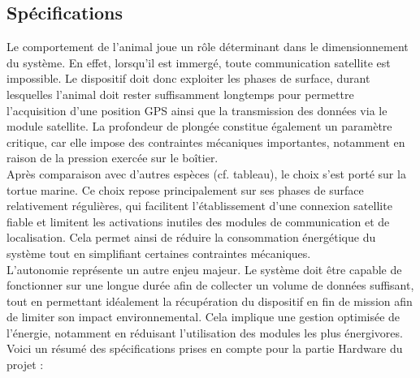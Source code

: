 \documentclass[12pt]{article}
\begin{document}
\subsection{Spécifications}

Le comportement de l’animal joue un rôle déterminant dans le dimensionnement du système. En effet, lorsqu’il est immergé, toute communication satellite est impossible. Le dispositif doit donc exploiter les phases de surface, durant lesquelles l’animal doit rester suffisamment longtemps pour permettre l’acquisition d’une position GPS ainsi que la transmission des données via le module satellite. La profondeur de plongée constitue également un paramètre critique, car elle impose des contraintes mécaniques importantes, notamment en raison de la pression exercée sur le boîtier. \\
Après comparaison avec d’autres espèces (cf. tableau), le choix s’est porté sur la tortue marine. Ce choix repose principalement sur ses phases de surface relativement régulières, qui facilitent l’établissement d’une connexion satellite fiable et limitent les activations inutiles des modules de communication et de localisation. Cela permet ainsi de réduire la consommation énergétique du système tout en simplifiant certaines contraintes mécaniques.\\

L’autonomie représente un autre enjeu majeur. Le système doit être capable de fonctionner sur une longue durée afin de collecter un volume de données suffisant, tout en permettant idéalement la récupération du dispositif en fin de mission afin de limiter son impact environnemental. Cela implique une gestion optimisée de l’énergie, notamment en réduisant l’utilisation des modules les plus énergivores.\\


\noindent Voici un résumé des spécifications prises en compte pour la partie Hardware du projet :
\end{document}

